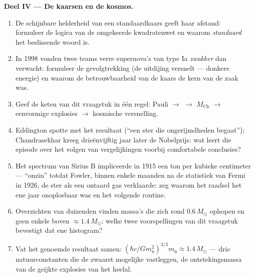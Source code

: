 \begin{problem}
\medskip\noindent\textbf{Deel IV --- De kaarsen en de
kosmos.}
\begin{enumerate}[resume]
  \item De schijnbare helderheid van een standaardkaars geeft haar
        afstand: formuleer de logica van de omgekeerde kwadratenwet en
        waarom \emph{standaard} het beslissende woord is.
  \item In 1998 vonden twee teams verre supernova's van type Ia
        \emph{zwakker} dan verwacht: formuleer de gevolgtrekking (de
        uitdijing versnelt --- donkere energie) en waarom de
        betrouwbaarheid van de kaars de kern van de zaak was.
  \item Geef de keten van dit vraagstuk in één regel: Pauli $\to$
         $\to$ $M_{\text{Ch}}$ $\to$ eenvormige explosies
        $\to$ kosmische versnelling.
  \item Eddington spotte met het resultaat (``een ster die
        ongerijmdheden begaat''); Chandrasekhar kreeg drieënvijftig jaar
        later de Nobelprijs: wat leert die episode over het volgen van
        vergelijkingen voorbij comfortabele conclusies?
  \item Het spectrum van Sirius B impliceerde in 1915 een ton per kubieke
        centimeter --- ``onzin'' totdat Fowler, binnen enkele maanden na
        de statistiek van Fermi in 1926, de ster als een ontaard gas
        verklaarde: zeg waarom het raadsel het ene jaar onoplosbaar was en
        het volgende routine.
  \item Overzichten van duizenden  vinden massa's die zich
        rond $0.6\,M_\odot$ ophopen en geen enkele boven $\approx1.4\,M_\odot$: welke twee voorspellingen van dit vraagstuk bevestigt dat
        ene histogram?
  \item Vat het genoemde resultaat samen: $(\hbar c/Gm_{\text{n}}^2)^{
        3/2}m_{\text{n}} \approx 1.4\,M_\odot$ --- drie natuurconstanten
        die de zwaarst mogelijke  vastleggen, de ontstekingsmassa
        van de geijkte explosies van het heelal.
\end{enumerate}
\end{problem}
